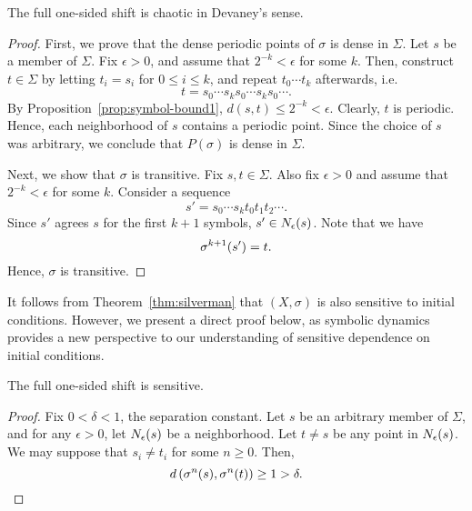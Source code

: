 \documentclass[10pt,twoside]{book}
\begin{document}
\begin{theorem}
  \citep{sternberg}
  The full one-sided shift is chaotic in Devaney's sense.
  \begin{proof}
    First, we prove that the dense periodic points of $\sigma$ is dense in $\Sigma$.
    Let $s$ be a member of $\Sigma$.
    Fix $\epsilon > 0$, and assume that $2^{-k} < \epsilon$ for some $k$.
    Then, construct $t \in \Sigma$ by letting $t_i = s_i$ for $0 \leq i \leq k$, and repeat $t_0 \cdots t_k$ afterwards, i.e.
    \begin{equation*}
      t = s_0 \cdots s_k s_0 \cdots s_k s_0 \cdots.
    \end{equation*}
    By Proposition~\ref{prop:symbol-bound1}, $d(s,t) \leq 2^{-k} < \epsilon$.
    Clearly, $t$ is periodic.
    Hence, each neighborhood of $s$ contains a periodic point.
    Since the choice of $s$ was arbitrary, we conclude that $P(\sigma)$ is dense in $\Sigma$.

    Next, we show that $\sigma$ is transitive.
    Fix $s,t \in \Sigma$.
    Also fix $\epsilon > 0$ and assume that $2^{-k} < \epsilon$ for some $k$.
    Consider a sequence
    \begin{equation*}
      s' = s_0 \cdots s_k t_0 t_1 t_2 \cdots.
    \end{equation*}
    Since $s'$ agrees $s$ for the first $k+1$ symbols, $s' \in N_{\epsilon}(s)$.
    Note that we have
    \begin{equation*}
      \sigma^{k+1}(s') = t.
    \end{equation*}
    Hence, $\sigma$ is transitive.
  \end{proof}
\end{theorem}
It follows from Theorem~\ref{thm:silverman} that $(X, \sigma)$ is also sensitive to initial conditions.
However, we present a direct proof below, as symbolic dynamics provides a new perspective to our understanding of sensitive dependence on initial conditions.
\begin{proposition}
  The full one-sided shift is sensitive.
  \begin{proof}
    Fix $0 < \delta < 1$, the separation constant.
    Let $s$ be an arbitrary member of $\Sigma$, and for any $\epsilon > 0$, let $N_{\epsilon}(s)$ be a neighborhood.
    Let $t \neq s$ be any point in $N_{\epsilon}(s)$.
    We may suppose that $s_i \neq t_i$ for some $n \geq 0$.
    Then,
    \begin{equation*}
      d\left( \sigma^{n}(s), \sigma^{n}(t) \right) \geq 1 > \delta.
    \end{equation*}
  \end{proof}
\end{proposition}
\end{document}
